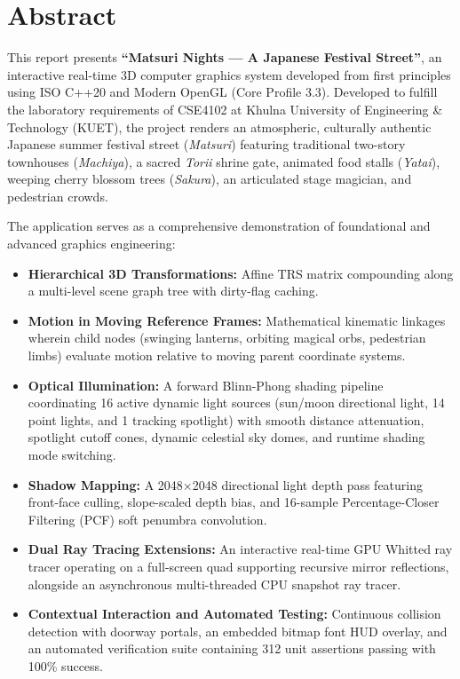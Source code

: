\documentclass[10pt,a4paper]{report}
\begin{document}

\chapter*{Abstract}
This report presents \textbf{``Matsuri Nights --- A Japanese Festival Street''}, an interactive real-time 3D computer graphics system developed from first principles using ISO C++20 and Modern OpenGL (Core Profile 3.3). Developed to fulfill the laboratory requirements of CSE4102 at Khulna University of Engineering \& Technology (KUET), the project renders an atmospheric, culturally authentic Japanese summer festival street (\textit{Matsuri}) featuring traditional two-story townhouses (\textit{Machiya}), a sacred \textit{Torii} shrine gate, animated food stalls (\textit{Yatai}), weeping cherry blossom trees (\textit{Sakura}), an articulated stage magician, and pedestrian crowds.

The application serves as a comprehensive demonstration of foundational and advanced graphics engineering:
\begin{itemize}
    \item \textbf{Hierarchical 3D Transformations:} Affine TRS matrix compounding along a multi-level scene graph tree with dirty-flag caching.
    \item \textbf{Motion in Moving Reference Frames:} Mathematical kinematic linkages wherein child nodes (swinging lanterns, orbiting magical orbs, pedestrian limbs) evaluate motion relative to moving parent coordinate systems.
    \item \textbf{Optical Illumination:} A forward Blinn-Phong shading pipeline coordinating 16 active dynamic light sources (sun/moon directional light, 14 point lights, and 1 tracking spotlight) with smooth distance attenuation, spotlight cutoff cones, dynamic celestial sky domes, and runtime shading mode switching.
    \item \textbf{Shadow Mapping:} A 2048$\times$2048 directional light depth pass featuring front-face culling, slope-scaled depth bias, and 16-sample Percentage-Closer Filtering (PCF) soft penumbra convolution.
    \item \textbf{Dual Ray Tracing Extensions:} An interactive real-time GPU Whitted ray tracer operating on a full-screen quad supporting recursive mirror reflections, alongside an asynchronous multi-threaded CPU snapshot ray tracer.
    \item \textbf{Contextual Interaction and Automated Testing:} Continuous collision detection with doorway portals, an embedded bitmap font HUD overlay, and an automated verification suite containing 312 unit assertions passing with 100\% success.
\end{itemize}
\newpage
\end{document}
